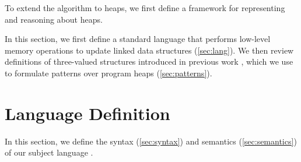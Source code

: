 
\label{ch:heap-patterns}
%

To extend the \impact algorithm to heaps, we first define a framework for representing and reasoning about heaps.


In this section, we first define a standard language that performs low-level
memory operations to update linked data structures
(\autoref{sec:lang}).
%
We then review definitions of three-valued structures introduced in
previous work \cite{sagiv02}, which we use to formulate patterns over
program heaps (\autoref{sec:patterns}).

\section{Language Definition}
\label{sec:lang}
%

In this section, we define the syntax (\autoref{sec:syntax}) and
semantics (\autoref{sec:semantics}) of our subject language \lang.

